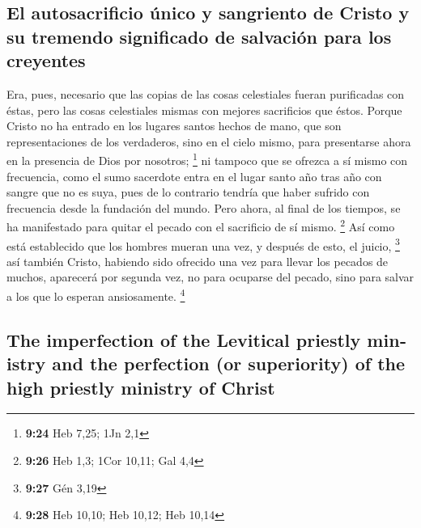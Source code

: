 \begin{paracol}{2}
\hypertarget{el-autosacrificio-uxfanico-y-sangriento-de-cristo-y-su-tremendo-significado-de-salvaciuxf3n-para-los-creyentes}{%
\subsection{El autosacrificio único y sangriento de Cristo y su tremendo
significado de salvación para los
creyentes}\label{el-autosacrificio-uxfanico-y-sangriento-de-cristo-y-su-tremendo-significado-de-salvaciuxf3n-para-los-creyentes}}

 Era, pues, necesario que las copias de las cosas
celestiales fueran purificadas con éstas, pero las cosas celestiales
mismas con mejores sacrificios que éstos.  Porque Cristo
no ha entrado en los lugares santos hechos de mano, que son
representaciones de los verdaderos, sino en el cielo mismo, para
presentarse ahora en la presencia de Dios por nosotros; \footnote{\textbf{9:24}
  Heb 7,25; 1Jn 2,1}  ni tampoco que se ofrezca a sí
mismo con frecuencia, como el sumo sacerdote entra en el lugar santo año
tras año con sangre que no es suya,  pues de lo contrario
tendría que haber sufrido con frecuencia desde la fundación del mundo.
Pero ahora, al final de los tiempos, se ha manifestado para quitar el
pecado con el sacrificio de sí mismo. \footnote{\textbf{9:26} Heb 1,3;
  1Cor 10,11; Gal 4,4}  Así como está establecido que los
hombres mueran una vez, y después de esto, el juicio, \footnote{\textbf{9:27}
  Gén 3,19}  así también Cristo, habiendo sido ofrecido
una vez para llevar los pecados de muchos, aparecerá por segunda vez, no
para ocuparse del pecado, sino para salvar a los que lo esperan
ansiosamente. \footnote{\textbf{9:28} Heb 10,10; Heb 10,12; Heb 10,14}

\switchcolumn
\begin{otherlanguage}{english}

\hypertarget{the-imperfection-of-the-levitical-priestly-ministry-and-the-perfection-or-superiority-of-the-high-priestly-ministry-of-christ}{%
\subsection{The imperfection of the Levitical priestly ministry and the
perfection (or superiority) of the high priestly ministry of
Christ}\label{the-imperfection-of-the-levitical-priestly-ministry-and-the-perfection-or-superiority-of-the-high-priestly-ministry-of-christ}}


\end{otherlanguage}
\end{paracol}
